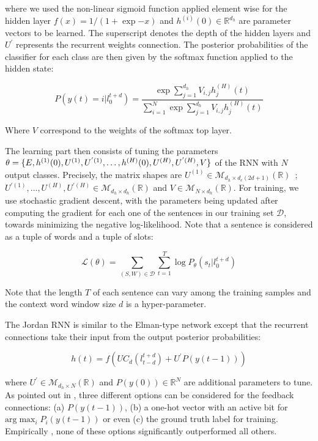 where we used the non-linear sigmoid function applied element wise for the
hidden layer $f(x)=1/(1+\exp{-x})$ and $h^{(i)} (0)\in\mathbb{R}^{d_h}$ are parameter vectors
to be learned. The superscript denotes the depth of the hidden layers and $U^{'}$
represents the recurrent weights connection. The posterior probabilities of the
classifier for each class are then given by the softmax function applied to the
hidden state:

\begin{equation}
P(y(t) = i \vert l_{0}^{t+d}) = \frac{\exp{\sum_{j=1}^{d_{h}}}V_{i,j}h_{j}^{(H)}(t)}{\sum_{i=1}^{N}\exp{\sum_{j=1}^{d_{h}}}V_{i,j}h_{j}^{(H)}(t)}
\end{equation}

Where $V$ correspond to the weights of the softmax top layer. 

The learning part then consists of tuning the parameters $\theta=\{ E, h^{(1)}
(0), U^{(1)}, \\ U^{'(1)},\dots,h^{(H)} (0), U^{(H)}, U^{'(H)} ,V \}$   of the RNN with $N$
output classes. Precisely, the matrix shapes are $U^{(1)}\in\mathcal{M}_{d_h\times d_e (2d+1)}
(\mathbb{R})$~;~ $U^{'(1)},\dots,U^{(H)}, U^{'(H)}\in\mathcal{M}_{d_h\times d_h} (\mathbb{R})$ and $V\in\mathcal{M}_{N\times d_h}(\mathbb{R})$. For
training, we use stochastic gradient descent, with the parameters being updated
after computing the gradient for each one of the sentences in our training set
$\mathcal{D}$, towards minimizing the negative log-likelihood. Note that a sentence is
considered as a tuple of words and a tuple of slots:

\begin{equation}
\mathcal{L}(\theta) = \sum_{(S,W)\in\mathcal{D}} \sum_{t=1}^{T}\log P_{\theta}(s_{t}\vert l_{0}^{t+d})
\end{equation}

Note that the length $T$ of each sentence can vary among the training samples and
the context word window size $d$ is a hyper-parameter.  

The Jordan RNN is similar to the Elman-type network except that the recurrent
connections take their input from the output posterior probabilities:

\begin{equation}
h(t) = f(UC_{d}(l^{t+d}_{t-d})+ U^{'}P(y(t-1)))
\end{equation}


where $U^{'}\in\mathcal{M}_{d_h\times N} (\mathbb{R})$ and
$P(y(0))\in\mathbb{R}^{N}$ are additional parameters to tune. As pointed out in
\citep{rnn15}, three different options can be considered for the feedback connections:
(a) $P(y(t-1))$, (b) a one-hot vector with an active bit for $\textrm{arg}
\max_i P_i(y(t-1))$ or even (c) the ground truth label for training.
Empirically \citep{rnn15}, none of these options significantly outperformed all others.  

